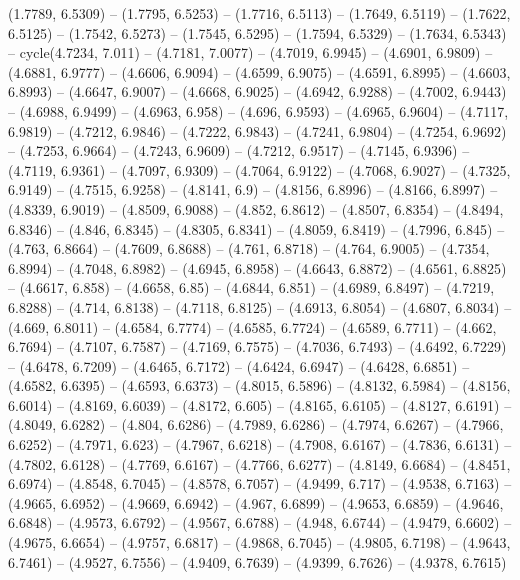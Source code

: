 {  (1.7789, 6.5309) -- (1.7795, 6.5253) -- (1.7716, 6.5113) -- (1.7649, 6.5119) 
  -- (1.7622, 6.5125) -- (1.7542, 6.5273) -- (1.7545, 6.5295) -- (1.7594, 
  6.5329) -- (1.7634, 6.5343) -- cycle(4.7234, 7.011) -- (4.7181, 7.0077) -- 
  (4.7019, 6.9945) -- (4.6901, 6.9809) -- (4.6881, 6.9777) -- (4.6606, 6.9094) 
  -- (4.6599, 6.9075) -- (4.6591, 6.8995) -- (4.6603, 6.8993) -- (4.6647, 
  6.9007) -- (4.6668, 6.9025) -- (4.6942, 6.9288) -- (4.7002, 6.9443) -- 
  (4.6988, 6.9499) -- (4.6963, 6.958) -- (4.696, 6.9593) -- (4.6965, 6.9604) -- 
  (4.7117, 6.9819) -- (4.7212, 6.9846) -- (4.7222, 6.9843) -- (4.7241, 6.9804) 
  -- (4.7254, 6.9692) -- (4.7253, 6.9664) -- (4.7243, 6.9609) -- (4.7212, 
  6.9517) -- (4.7145, 6.9396) -- (4.7119, 6.9361) -- (4.7097, 6.9309) -- 
  (4.7064, 6.9122) -- (4.7068, 6.9027) -- (4.7325, 6.9149) -- (4.7515, 6.9258) 
  -- (4.8141, 6.9) -- (4.8156, 6.8996) -- (4.8166, 6.8997) -- (4.8339, 6.9019) 
  -- (4.8509, 6.9088) -- (4.852, 6.8612) -- (4.8507, 6.8354) -- (4.8494, 6.8346)
   -- (4.846, 6.8345) -- (4.8305, 6.8341) -- (4.8059, 6.8419) -- (4.7996, 6.845)
   -- (4.763, 6.8664) -- (4.7609, 6.8688) -- (4.761, 6.8718) -- (4.764, 6.9005) 
  -- (4.7354, 6.8994) -- (4.7048, 6.8982) -- (4.6945, 6.8958) -- (4.6643, 
  6.8872) -- (4.6561, 6.8825) -- (4.6617, 6.858) -- (4.6658, 6.85) -- (4.6844, 
  6.851) -- (4.6989, 6.8497) -- (4.7219, 6.8288) -- (4.714, 6.8138) -- (4.7118, 
  6.8125) -- (4.6913, 6.8054) -- (4.6807, 6.8034) -- (4.669, 6.8011) -- (4.6584,
   6.7774) -- (4.6585, 6.7724) -- (4.6589, 6.7711) -- (4.662, 6.7694) -- 
  (4.7107, 6.7587) -- (4.7169, 6.7575) -- (4.7036, 6.7493) -- (4.6492, 6.7229) 
  -- (4.6478, 6.7209) -- (4.6465, 6.7172) -- (4.6424, 6.6947) -- (4.6428, 
  6.6851) -- (4.6582, 6.6395) -- (4.6593, 6.6373) -- (4.8015, 6.5896) -- 
  (4.8132, 6.5984) -- (4.8156, 6.6014) -- (4.8169, 6.6039) -- (4.8172, 6.605) --
   (4.8165, 6.6105) -- (4.8127, 6.6191) -- (4.8049, 6.6282) -- (4.804, 6.6286) 
  -- (4.7989, 6.6286) -- (4.7974, 6.6267) -- (4.7966, 6.6252) -- (4.7971, 6.623)
   -- (4.7967, 6.6218) -- (4.7908, 6.6167) -- (4.7836, 6.6131) -- (4.7802, 
  6.6128) -- (4.7769, 6.6167) -- (4.7766, 6.6277) -- (4.8149, 6.6684) -- 
  (4.8451, 6.6974) -- (4.8548, 6.7045) -- (4.8578, 6.7057) -- (4.9499, 6.717) --
   (4.9538, 6.7163) -- (4.9665, 6.6952) -- (4.9669, 6.6942) -- (4.967, 6.6899) 
  -- (4.9653, 6.6859) -- (4.9646, 6.6848) -- (4.9573, 6.6792) -- (4.9567, 
  6.6788) -- (4.948, 6.6744) -- (4.9479, 6.6602) -- (4.9675, 6.6654) -- (4.9757,
   6.6817) -- (4.9868, 6.7045) -- (4.9805, 6.7198) -- (4.9643, 6.7461) -- 
  (4.9527, 6.7556) -- (4.9409, 6.7639) -- (4.9399, 6.7626) -- (4.9378, 6.7615) 
}
